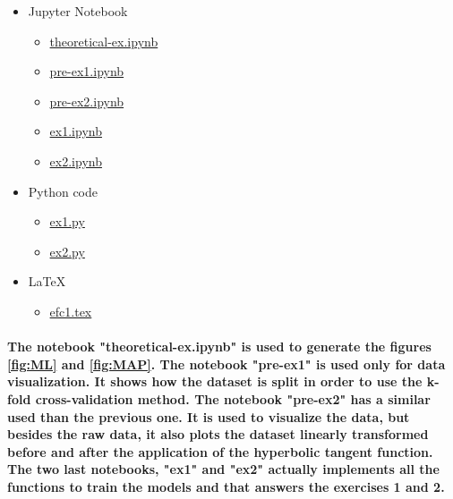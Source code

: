 \documentclass[a4paper]{article}
\begin{document}
\begin{itemize}
    \item Jupyter Notebook
    \begin{itemize}
        \item \href{https://github.com/ito-rafael/IA006C-MachineLearning/blob/master/efc1/theoretical-ex.ipynb}{theoretical-ex.ipynb}
        \item \href{https://github.com/ito-rafael/IA006C-MachineLearning/blob/master/efc1/pre-ex1.ipynb}{pre-ex1.ipynb}
        \item \href{https://github.com/ito-rafael/IA006C-MachineLearning/blob/master/efc1/pre-ex2.ipynb}{pre-ex2.ipynb}
        \item \href{https://github.com/ito-rafael/IA006C-MachineLearning/blob/master/efc1/ex1.ipynb}{ex1.ipynb}
        \item \href{https://github.com/ito-rafael/IA006C-MachineLearning/blob/master/efc1/ex2.ipynb}{ex2.ipynb}
    \end{itemize}
    \item Python code
    \begin{itemize}
        \item \href{https://github.com/ito-rafael/IA006C-MachineLearning/blob/master/efc1/ex1.py}{ex1.py}
        \item \href{https://github.com/ito-rafael/IA006C-MachineLearning/blob/master/efc1/ex2.py}{ex2.py}
    \end{itemize}
    \item \LaTeX
    \begin{itemize}
        \item \href{}{efc1.tex}
    \end{itemize}
\end{itemize}

\paragraph{The notebook "theoretical-ex.ipynb" is used to generate the figures \ref{fig:ML} and \ref{fig:MAP}. The notebook "pre-ex1" is used only for data visualization. It shows how the dataset is split in order to use the k-fold cross-validation method. The notebook "pre-ex2" has a similar used than the previous one. It is used to visualize the data, but besides the raw data, it also plots the dataset linearly transformed before and after the application of the hyperbolic tangent function. The two last notebooks, "ex1" and "ex2" actually implements all the functions to train the models and that answers the exercises 1 and 2.}
\end{document}
